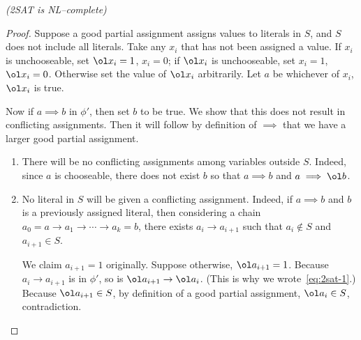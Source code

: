 \begin{problem}{\it(2SAT is NL--complete)}
\begin{proof}
Suppose a good partial assignment assigns values to literals in $S$, and $S$ does not include all literals.
Take any $x_i$ that has not been assigned a value. If $x_i$ is unchooseable, set $\ol x_i=1$, $x_i=0$; if $\ol x_i$ is unchooseable, set $x_i=1$, $\ol x_i=0$. Otherwise set the value of $\ol x_i$ arbitrarily. Let $a$ be whichever of $x_i$, $\ol x_i$ is true.

Now if $a\implies b$ in $\phi'$, then set $b$ to be true. We show that this does not result in conflicting assignments. Then it will follow by definition of $\implies$ that we have a larger good partial assignment.
\begin{enumerate}
\item
There will be no conflicting assignments among variables outside $S$. Indeed, since $a$ is chooseable, there does not exist $b$ so that $a\implies b$ and $a\implies \ol b$.
\item
No literal in $S$ will be given a conflicting assignment. Indeed, if $a\implies b$ and $b$ is a previously assigned literal, then considering a chain $a_0=a\to a_1\to \cdots \to a_k=b$, there exists $a_i\to a_{i+1}$ such that $a_i\nin S$ and $a_{i+1}\in S$. 

We claim $a_{i+1}=1$ originally. Suppose otherwise, $\ol a_{i+1}=1$. Because $a_i\to a_{i+1}$ is in $\phi'$, so is $\ol a_{i+1}\to \ol a_i$. (This is why we wrote~\eqref{eq:2sat-1}.) Because $\ol a_{i+1}\in S$, by definition of a good partial assignment, $\ol a_i\in S$, contradiction.


\end{enumerate}
\end{proof}
\end{problem}
